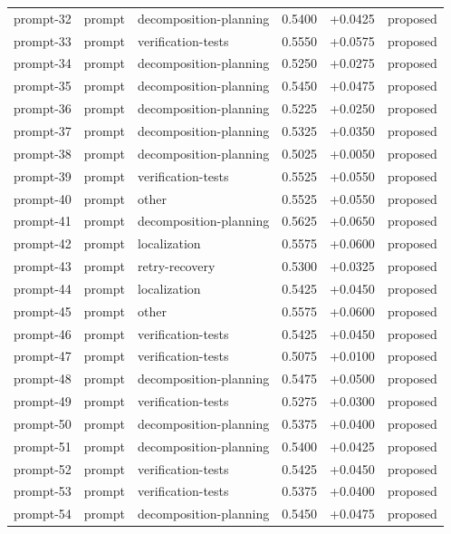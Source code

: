 \begin{center}
\begin{longtable}{llp{5.2cm}rrl}
prompt-32 & prompt & decomposition-planning & 0.5400 & +0.0425 & proposed \\
prompt-33 & prompt & verification-tests & 0.5550 & +0.0575 & proposed \\
prompt-34 & prompt & decomposition-planning & 0.5250 & +0.0275 & proposed \\
prompt-35 & prompt & decomposition-planning & 0.5450 & +0.0475 & proposed \\
prompt-36 & prompt & decomposition-planning & 0.5225 & +0.0250 & proposed \\
prompt-37 & prompt & decomposition-planning & 0.5325 & +0.0350 & proposed \\
prompt-38 & prompt & decomposition-planning & 0.5025 & +0.0050 & proposed \\
prompt-39 & prompt & verification-tests & 0.5525 & +0.0550 & proposed \\
prompt-40 & prompt & other & 0.5525 & +0.0550 & proposed \\
prompt-41 & prompt & decomposition-planning & 0.5625 & +0.0650 & proposed \\
prompt-42 & prompt & localization & 0.5575 & +0.0600 & proposed \\
prompt-43 & prompt & retry-recovery & 0.5300 & +0.0325 & proposed \\
prompt-44 & prompt & localization & 0.5425 & +0.0450 & proposed \\
prompt-45 & prompt & other & 0.5575 & +0.0600 & proposed \\
prompt-46 & prompt & verification-tests & 0.5425 & +0.0450 & proposed \\
prompt-47 & prompt & verification-tests & 0.5075 & +0.0100 & proposed \\
prompt-48 & prompt & decomposition-planning & 0.5475 & +0.0500 & proposed \\
prompt-49 & prompt & verification-tests & 0.5275 & +0.0300 & proposed \\
prompt-50 & prompt & decomposition-planning & 0.5375 & +0.0400 & proposed \\
prompt-51 & prompt & decomposition-planning & 0.5400 & +0.0425 & proposed \\
prompt-52 & prompt & verification-tests & 0.5425 & +0.0450 & proposed \\
prompt-53 & prompt & verification-tests & 0.5375 & +0.0400 & proposed \\
prompt-54 & prompt & decomposition-planning & 0.5450 & +0.0475 & proposed \\

\end{longtable}
\end{center}
